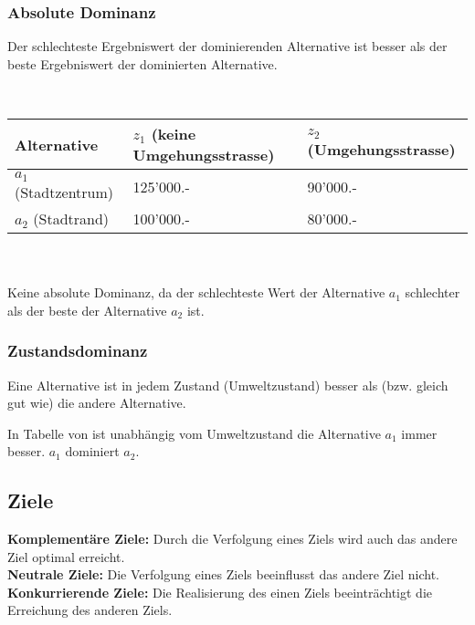 \subsubsection{Absolute Dominanz}
Der schlechteste Ergebniswert der dominierenden Alternative ist besser als der beste Ergebniswert der
dominierten Alternative.
\begin{example} \\
	\begin{tabular}{|l|l|l|}
		\hline
		Alternative & $z_1$ (keine Umgehungsstrasse) & $z_2$ (Umgehungsstrasse) \\ \hline
		$a_1$ (Stadtzentrum) & 125'000.- & 90'000.- \\ \hline
		$a_2$ (Stadtrand) & 100'000.- & 80'000.- \\ \hline
	\end{tabular}\\ \ \\
	Keine absolute Dominanz, da der schlechteste Wert der Alternative $a_1$ schlechter als der beste der Alternative $a_2$ ist.
\end{example}

\subsubsection{Zustandsdominanz}
Eine Alternative ist in jedem Zustand (Umweltzustand) besser als (bzw. gleich gut wie) die andere Alternative.
\begin{example} 
	In Tabelle von  ist unabhängig vom Umweltzustand die Alternative $a_1$ immer besser. $a_1$ dominiert $a_2$.
\end{example}

\subsection{Ziele}
\textbf{Komplementäre Ziele:} Durch die Verfolgung eines Ziels wird auch das andere Ziel optimal erreicht. \\
\textbf{Neutrale Ziele:} Die Verfolgung eines Ziels beeinflusst das andere Ziel nicht. \\
\textbf{Konkurrierende Ziele:} Die Realisierung des einen Ziels beeinträchtigt die Erreichung des anderen Ziels.

